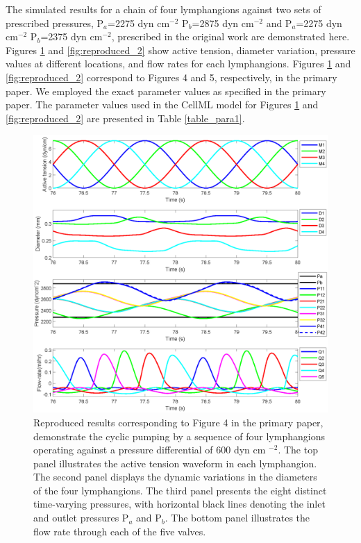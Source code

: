 \documentclass[fleqn,10pt]{physiome}
\begin{document}
The simulated results for a chain of four lymphangions against two sets of prescribed pressures, P$_{a}$=2275 dyn cm$^{-2}$ P$_{b}$=2875 dyn cm$^{-2}$ and P$_{a}$=2275 dyn cm$^{-2}$ P$_{b}$=2375 dyn cm$^{-2}$, prescribed in the original work are demonstrated here. Figures \ref{fig:reproduced_1} and  \ref{fig:reproduced_2} show active tension, diameter variation, pressure values at different locations, and flow rates for each lymphangions. 
Figures \ref{fig:reproduced_1} and \ref{fig:reproduced_2} correspond to Figures 4 and 5, respectively, in the primary paper. We employed the exact parameter values as specified in the primary paper. The parameter values used in the CellML model for Figures \ref{fig:reproduced_1} and \ref{fig:reproduced_2} are presented in Table \ref{table_para1}.
\begin{figure}[p]\centering
\includegraphics[trim=1.25cm 5.0cm 0.0cm 0.0cm, clip=true, totalheight=0.75\textheight, ]{figure_2_reproduced.png}
\caption{Reproduced results corresponding to Figure 4 in the primary paper, demonstrate the cyclic pumping by a sequence of four lymphangions operating against a pressure differential of 600 dyn cm $^{-2}$. The top panel illustrates the active tension waveform in each lymphangion. The second panel displays the dynamic variations in the diameters of the four lymphangions. The third panel presents the eight distinct time-varying pressures, with horizontal black lines denoting the inlet and outlet pressures P$_{a}$ and P$_{b}$. The bottom panel illustrates the flow rate through each of the five valves.}
\label{fig:reproduced_1}
\end{figure}
\end{document}
